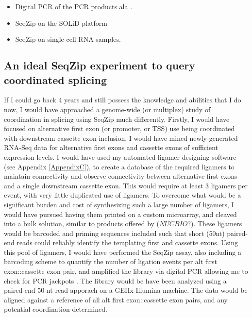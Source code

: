     \begin{itemize}
      \item Digital PCR of the PCR products ala \citep{Shiroguchi2012a}. 
      \item SeqZip on the SOLiD platform
      \item SeqZip on single-cell RNA samples.  
      \end{itemize}

  \subsection{An ideal SeqZip experiment to query coordinated splicing}
    If I could go back 4 years and still possess the knowledge and abilities that I do now, I would have approached a genome-wide (or multiplex) study of coordination in splicing using SeqZip much differently. Firstly, I would have focused on alternative first exon (or promoter, or TSS) use being coordinated with downstream cassette exon inclusion. I would have mined newly-generated RNA-Seq data \citep{Wang2008, Pan2008} for alternative first exons and cassette exons of sufficient expression levels. I would have used my automated ligamer designing software (see Appendix \ref{AppendixC}), to create a database of the required ligamers to maintain connectivity and observe connectivity between alternative first exons and a single downstream cassette exon. This would require at least 3 ligamers per event, with very little duplicated use of ligamers. To overcome what would be a significant burden and cost of synthesizing such a large number of ligamers, I would have pursued having them printed on a custom microarray, and cleaved into a bulk solution, similar to products offered by ($NUC BIO?$). These ligamers would be barcoded and priming sequences included such that short (50nt) paired-end reads could reliably identify the templating first and cassette exons. Using this pool of ligamers, I would have performed the SeqZip assay, also including a barcoding scheme to quantify the number of ligation events per alt first exon::cassette exon pair, and amplified the library via digital PCR allowing me to check for PCR jackpots \citep{Shiroguchi2012a}. The library would be have been analyzed using a paired-end 50 nt read apporach on a GEIIx Illumina machine. The data would be aligned against a reference of all alt first exon::cassette exon pairs, and any potential coordination determined.

